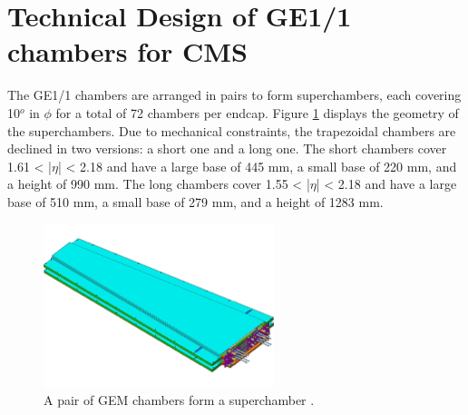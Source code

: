   \section{Technical Design of GE1/1 chambers for CMS}

    The GE1/1 chambers are arranged in pairs to form superchambers, each covering 10$^o$ in $ \phi $ for a total of 72 chambers per endcap. Figure \ref{fig:II-1-superchamber} displays the geometry of the superchambers. Due to mechanical constraints, the trapezoidal chambers are declined in two versions: a short one and a long one. The short chambers cover 1.61 < |$\eta$| < 2.18 and have a large base of 445 mm, a small base of 220 mm, and a height of 990 mm. The long chambers cover 1.55 < |$\eta$| < 2.18 and have a large base of 510 mm, a small base of 279 mm, and a height of 1283 mm. \\

    \begin{figure}[h!]
      \centering
      \includegraphics[width=0.6\textwidth]{img/II-1-gem/superchamber.pdf}
      \caption{A pair of GEM chambers form a superchamber \cite{Colaleo:2021453}.}
      \label{fig:II-1-superchamber}
    \end{figure}

